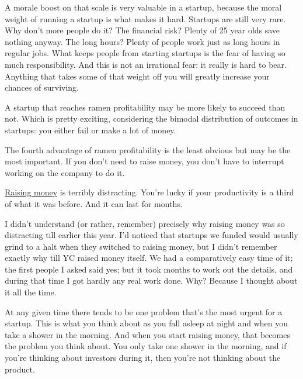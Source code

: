 A
                    morale boost on that scale is very valuable in a startup,
                    because the moral weight of running a startup is what makes
                    it hard. Startups are still very rare. Why don't more people
                    do it? The financial risk? Plenty of 25 year olds save
                    nothing anyway. The long hours? Plenty of people work just
                    as long hours in regular jobs. What keeps people from
                    starting startups is the fear of having so much
                    responsibility. And this is not an irrational fear: it
                    really is hard to bear. Anything that takes some of that
                    weight off you will greatly increase your chances of
                    surviving.

A startup that reaches ramen
                    profitability may be more likely to succeed than not. Which
                    is pretty exciting, considering the bimodal distribution of
                    outcomes in startups: you either fail or make a lot of
                    money.

The fourth advantage of ramen
                    profitability is the least obvious but may be the most
                    important. If you don't need to raise money, you don't have
                    to interrupt working on the company to do it.

\href{http://www.paulgraham.com/fundraising.html}{Raising money}
                    is terribly distracting. You're lucky if your productivity
                    is a third of what it was before. And it can last for
                    months.

I didn't understand (or rather, remember)
                    precisely why raising money was so distracting till earlier
                    this year. I'd noticed that startups we funded would usually
                    grind to a halt when they switched to raising money, but I
                    didn't remember exactly why till YC raised money itself. We
                    had a comparatively easy time of it; the first people I
                    asked said yes; but it took months to work out the details,
                    and during that time I got hardly any real work done. Why?
                    Because I thought about it all the time.

At any
                    given time there tends to be one problem that's the most
                    urgent for a startup. This is what you think about as you
                    fall asleep at night and when you take a shower in the
                    morning. And when you start raising money, that becomes the
                    problem you think about. You only take one shower in the
                    morning, and if you're thinking about investors during it,
                    then you're not thinking about the product.

